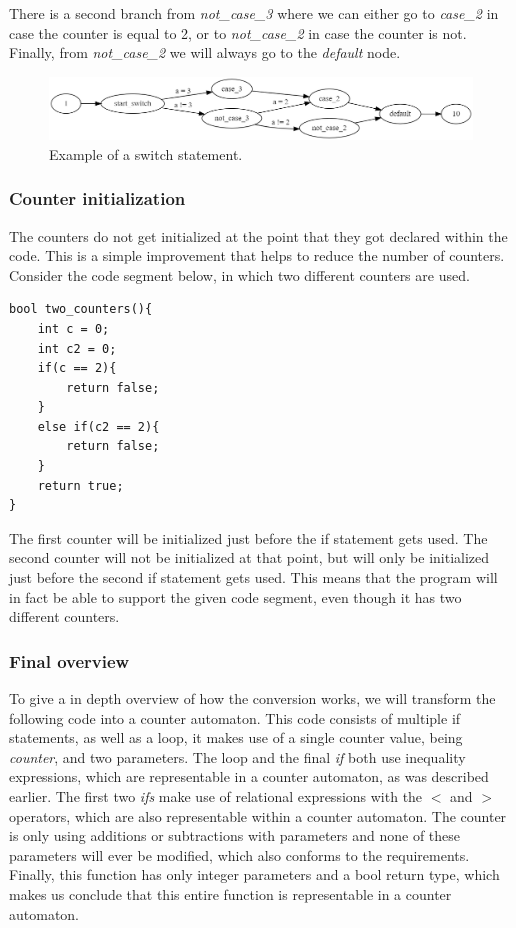 \documentclass[12pt]{article}
\begin{document}
There is a second branch from \textit{not\_case\_3} where we can either go to \textit{case\_2} in case the counter is equal to 2, or to \textit{not\_case\_2} in case the counter is not. Finally, from \textit{not\_case\_2} we will always go to the \textit{default} node.

\begin{figure}[h]
	\centering
	\includegraphics[width=\linewidth]{counter_switch}
	\caption{Example of a switch statement.}
	\label{fig:counter_switch}
\end{figure}

\subsubsection{Counter initialization}
The counters do not get initialized at the point that they got declared within the code. This is a simple improvement that helps to reduce the number of counters. Consider the code segment below, in which two different counters are used.

\begin{lstlisting}[style=CStyle]
bool two_counters(){
	int c = 0;
	int c2 = 0;
	if(c == 2){
		return false;
	}
	else if(c2 == 2){
		return false;
	}
	return true;
}
\end{lstlisting}
The first counter will be initialized just before the if statement gets used. The second counter will not be initialized at that point, but will only be initialized just before the second if statement gets used. This means that the program will in fact be able to support the given code segment, even though it has two different counters.

\subsubsection{Final overview}
To give a in depth overview of how the conversion works, we will transform the following code into a counter automaton. This code consists of multiple if statements, as well as a loop, it makes use of a single counter value, being \textit{counter}, and two parameters. The loop and the final \textit{if} both use inequality expressions, which are representable in a counter automaton, as was described earlier. The first two \textit{ifs} make use of relational expressions with the $<$ and $>$ operators, which are also representable within a counter automaton. The counter is only  using additions or subtractions with parameters and none of these parameters will ever be modified, which also conforms to the requirements. Finally, this function has only integer parameters and a bool return type, which makes us conclude that this entire function is representable in a counter automaton.
\end{document}
